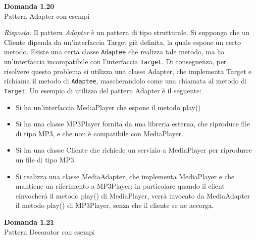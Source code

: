 \documentclass{article}
\newenvironment{problem}[2][Domanda]
    { \begin{mdframed}[backgroundcolor=gray!20] \textbf{#1 #2} \\}
    {  \end{mdframed}}
\newenvironment{solution}
    {\textit{Risposta:}}
    {}
\begin{document}
\begin{problem}{1.20}
Pattern Adapter con esempi
\end{problem}
\begin{solution}
Il pattern \textit{Adapter} è un pattern di tipo strutturale.
Si supponga che un Cliente dipenda da un'interfaccia Target già definita, la quale espone un certo metodo.
Esiste una certa classe \texttt{Adaptee} che realizza tale metodo, ma ha un'interfaccia incompatibile con l'interfaccia \texttt{Target}.
Di conseguenza, per risolvere questo problema si utilizza una classe Adapter, che implementa Target e richiama il metodo di \texttt{Adaptee}, mascherandolo come una chiamata al metodo di \texttt{Target}.
Un esempio di utilizzo del pattern Adapter è il seguente:
\begin{itemize}
	\item Si ha un'interfaccia MediaPlayer che espone il metodo play()
	\item Si ha una classe MP3Player fornita da una libreria esterna, che riproduce file di tipo MP3, e che non è compatibile con MediaPlayer.
	\item Si ha una classe Cliente che richiede un servizio a MediaPlayer per riprodurre un file di tipo MP3.
	\item Si realizza una classe MediaAdapter, che implementa MediaPlayer e che mantiene un riferimento a MP3Player; in particolare quando il client einvocherà il metodo play() di MediaPlayer, verrà invocato da MediaAdapter il metodo play() di MP3Player, senza che il cliente se ne accorga.

\end{itemize}
\end{solution}
\newpage
\begin{problem}{1.21}
Pattern Decorator con esempi
\end{problem}
\end{document}
